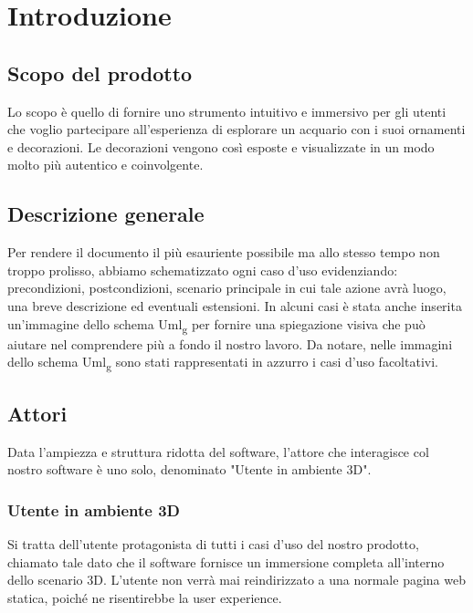 \section{Introduzione}
\subsection{Scopo del prodotto}
Lo scopo è quello di fornire uno strumento intuitivo e immersivo per gli utenti che voglio partecipare all'esperienza di esplorare un acquario con i suoi ornamenti e decorazioni.
\newline
Le decorazioni vengono così esposte e visualizzate in un modo molto più autentico e coinvolgente.

\subsection{Descrizione generale}
Per rendere il documento il più esauriente possibile ma allo stesso tempo non troppo prolisso, abbiamo schematizzato ogni caso d'uso evidenziando:  precondizioni, postcondizioni, scenario principale in cui tale azione avrà luogo, una breve descrizione ed eventuali estensioni.\newline
In alcuni casi è stata anche inserita un'immagine dello schema Uml\textsubscript{g} per fornire una spiegazione visiva che può aiutare nel comprendere più a fondo il nostro lavoro.\newline
Da notare, nelle immagini dello schema Uml\textsubscript{g} sono stati rappresentati in azzurro i casi d'uso facoltativi.

\subsection{Attori}
Data l'ampiezza e struttura ridotta del software, l'attore che interagisce col nostro software è uno solo, denominato "Utente in ambiente 3D". 

\subsubsection{Utente in ambiente 3D}
Si tratta dell'utente protagonista di tutti i casi d'uso del nostro prodotto, chiamato tale dato che il software fornisce un immersione completa all'interno dello scenario 3D. \newline
L'utente non verrà mai reindirizzato a una normale pagina web statica, poiché ne risentirebbe la user experience. 

\pagebreak

